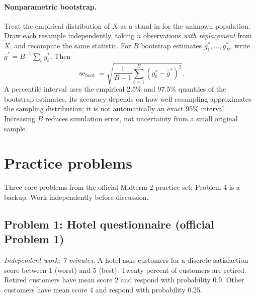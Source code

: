 \documentclass[11pt]{article}
\newcommand{\se}{\operatorname{se}}
\begin{document}
\paragraph{Nonparametric bootstrap.}
Treat the empirical distribution of $X$ as a stand-in for the unknown population.
Draw each resample independently, taking $n$ observations \emph{with replacement}
from $X$, and recompute the same statistic. For $B$ bootstrap estimates
$g_1^*,\ldots,g_B^*$, write $\bar g^*=B^{-1}\sum_b g_b^*$. Then
\[
 \se_{\mathrm{boot}}=
 \sqrt{\frac1{B-1}\sum_{b=1}^B(g_b^*-\bar g^*)^2}.
\]
A percentile interval uses the empirical 2.5\% and 97.5\% quantiles of the
bootstrap estimates. Its accuracy depends on how well resampling approximates
the sampling distribution; it is not automatically an exact 95\% interval.
Increasing $B$ reduces simulation error, not uncertainty from a small original sample.

\newpage
\section*{Practice problems}
\noindent Three core problems from the official Midterm 2 practice set;
Problem 4 is a backup. Work independently before discussion.

\subsection*{Problem 1: Hotel questionnaire (official Problem 1)}
\noindent\textit{Independent work: 7 minutes.}
A hotel asks customers for a discrete satisfaction score between 1 (worst)
and 5 (best). Twenty percent of customers are retired. Retired customers
have mean score 2 and respond with probability 0.9. Other customers have
mean score 4 and respond with probability 0.25.
\end{document}
